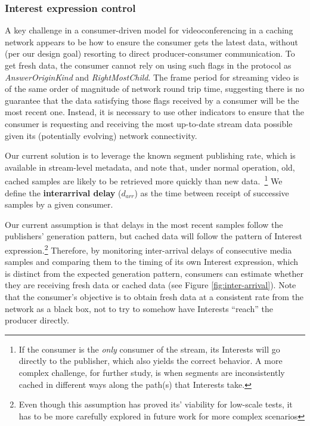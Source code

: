 \documentclass{icn/sig-alternate-2013} %
\begin{document}
\subsubsection{Interest expression control}


A key challenge in a consumer-driven model for videoconferencing in a caching network appears to be how to ensure the consumer gets the latest data, without (per our design goal) resorting to direct producer-consumer communication.
To get fresh data, the consumer cannot rely on using such flags in the protocol as \textit{AnswerOriginKind} and \textit{RightMostChild}. The frame period for  streaming video is of the same order of magnitude of network round trip time, suggesting there is no guarantee that the data satisfying those flags received by a consumer will be the most recent one. Instead, it is necessary to use other indicators to ensure that the consumer is requesting and receiving the most up-to-date stream data possible given its (potentially evolving) network connectivity. 

Our current solution is to leverage the known segment publishing rate, which is available in stream-level metadata, and note that, under normal operation, old, cached samples are likely to be retrieved more quickly than new data.~\footnote{If the consumer is the \emph{only} consumer of the stream, its Interests will go directly to the publisher, which also yields the correct behavior. A more complex challenge, for further study, is when segments are inconsistently cached in different ways along the path(s) that Interests take.} We define the \textbf{interarrival delay} ($d_{arr}$) as the time between receipt of successive samples by a given consumer. 

Our current assumption is that delays in the most recent samples follow the publishers' generation pattern, but cached data will follow the pattern of Interest expression.\footnote{Even though this assumption has proved its' viability for low-scale tests, it has to be more carefully explored in future work for more complex scenarios} Therefore, by monitoring inter-arrival delays of consecutive media samples and comparing them to the timing of its own Interest expression, which is distinct from the expected generation pattern, consumers can estimate whether they are receiving fresh data or cached data (see Figure \ref{fig:inter-arrival}). Note that the consumer's objective is to obtain fresh data at a consistent rate from the network as a black box, not to try to somehow have Interests ``reach'' the producer directly.  
\end{document}
